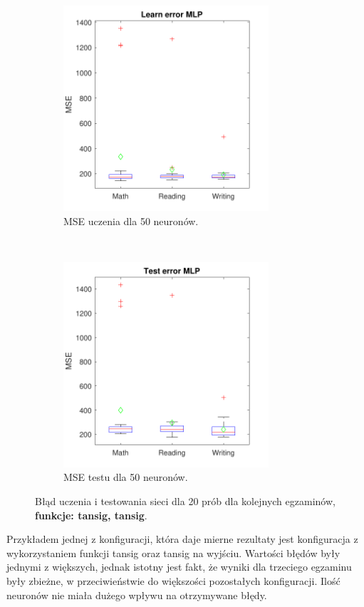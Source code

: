 \documentclass[12pt]{article}
\begin{document}
\begin{figure}[H]
\begin{subfigure}[t]{0.48\textwidth} 
\centering
\includegraphics[height=3in]{tansig_tansig_50_learnBoxplot.pdf}
\caption{MSE uczenia dla 50 neuronów.}
\end{subfigure}
~~
\begin{subfigure}[t]{0.48\textwidth} 
\centering
\includegraphics[height=3in]{tansig_tansig_50_testBoxplot.pdf}
\caption{MSE testu dla 50 neuronów.}
\end{subfigure}

\caption{Błąd uczenia i testowania sieci dla 20 prób dla kolejnych egzaminów, \textbf{funkcje: tansig, tansig}.}
\end{figure}
Przykładem jednej z konfiguracji, która daje mierne rezultaty jest konfiguracja z wykorzystaniem funkcji tansig oraz tansig na wyjściu. Wartości błędów były jednymi z większych, jednak istotny jest fakt, że wyniki dla trzeciego egzaminu były zbieżne, w przeciwieństwie do większości pozostałych konfiguracji. Ilość neuronów nie miała dużego wpływu na otrzymywane błędy.
\end{document}
